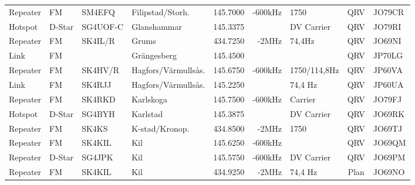 \begin{landscape}
\begin{longtable}{llllrrlcl}
	Repeater                  & FM            & SM4EFQ        & Filipstad/Storh.    & 145.7000          & -600kHz        & 1750             & QRV             & JO79CR           \\
	Hotspot                   & D-Star        & SG4UOF-C      & Glanshammar         & 145.3375          &                & DV Carrier       & QRV             & JO79RI           \\
	Repeater                  & FM            & SK4IL/R       & Grums               & 434.7250          & -2MHz          & 74,4Hz           & QRV             & JO69NI           \\
	Link                      & FM            &               & Grängesberg         & 145.4500          &                &                  & QRV             & JP70LG           \\
	Repeater                  & FM            & SK4HV/R       & Hagfors/Värmullsås. & 145.6750          & -600kHz        & 1750/114,8Hz     & QRV             & JP60VA           \\
	Link                      & FM            & SK4RJJ        & Hagfors/Värmullsås. & 145.2250          &                & 74,4 Hz          & QRV             & JP60UA           \\
	Repeater                  & FM            & SK4RKD        & Karlskoga           & 145.7500          & -600kHz        & Carrier          & QRV             & JO79FJ           \\
	Hotspot                   & D-Star        & SG4BYH        & Karlstad            & 145.3875          &                & DV Carrier       & QRV             & JO69RK           \\
	Repeater                  & FM            & SK4KS         & K-stad/Kronop.      & 434.8500          & -2MHz          & 1750             & QRV             & JO69TJ           \\
	Repeater                  & FM            & SK4KIL        & Kil                 & 145.6250          & -600kHz        &                  & QRV             & JO69QM           \\
	Repeater                  & D-Star        & SG4JPK        & Kil                 & 145.5750          & -600kHz        & DV Carrier       & QRV             & JO69PM           \\
	Repeater                  & FM            & SK4KIL        & Kil                 & 434.9250          & -2MHz          & 74,4 Hz          & Plan            & JO69NO           \\

\end{longtable}
\end{landscape}
